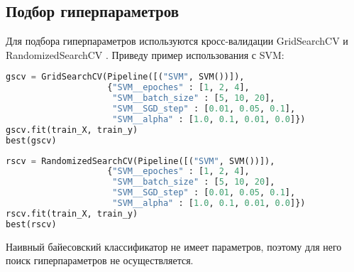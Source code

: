 \subsection{Подбор гиперпараметров}
Для подбора гиперпараметров используются кросс-валидации GridSearchCV \cite{scikit-grid} и RandomizedSearchCV \cite{scikit-rand}. Приведу пример использования с SVM:
\begin{lstlisting}[language=Python]
gscv = GridSearchCV(Pipeline([("SVM", SVM())]),
                    {"SVM__epoches" : [1, 2, 4],
                     "SVM__batch_size" : [5, 10, 20],
                     "SVM__SGD_step" : [0.01, 0.05, 0.1],
                     "SVM__alpha" : [1.0, 0.1, 0.01, 0.0]})
gscv.fit(train_X, train_y)
best(gscv)
\end{lstlisting}
\begin{lstlisting}[language=Python]
rscv = RandomizedSearchCV(Pipeline([("SVM", SVM())]),
                    {"SVM__epoches" : [1, 2, 4],
                     "SVM__batch_size" : [5, 10, 20],
                     "SVM__SGD_step" : [0.01, 0.05, 0.1],
                     "SVM__alpha" : [1.0, 0.1, 0.01, 0.0]})
rscv.fit(train_X, train_y)
best(rscv)
\end{lstlisting}

Наивный байесовский классификатор не имеет параметров, поэтому для него поиск гиперпараметров не осуществляется.
\pagebreak

